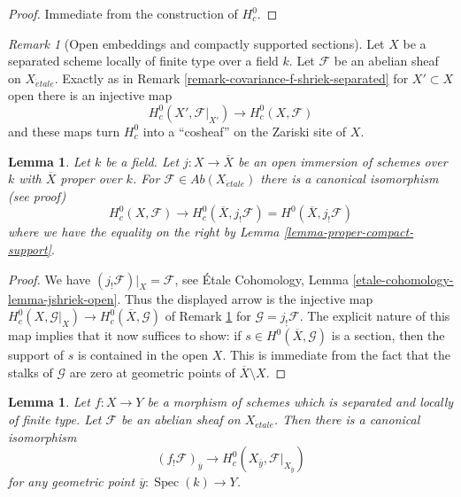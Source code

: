 \documentclass{stacks-project}
\theoremstyle{plain}
\newtheorem{lemma}[subsection]{Lemma}
\theoremstyle{definition}
\theoremstyle{remark}
\newtheorem{remark}[subsection]{Remark}
\numberwithin{equation}{subsection}
\def\Spec{\mathop{\mathrm{Spec}}}
\def\etale{{\acute{e}tale}}
\begin{document}
\begin{proof}
Immediate from the construction of $H^0_c$.
\end{proof}

\begin{remark}[Open embeddings and compactly supported sections]
\label{remark-covariance-compact-support}
Let $X$ be a separated scheme locally of finite type over a field $k$.
Let $\mathcal{F}$ be an abelian sheaf on $X_\etale$.
Exactly as in Remark \ref{remark-covariance-f-shriek-separated}
for $X' \subset X$ open there is an injective map
$$
H^0_c(X', \mathcal{F}|_{X'}) \longrightarrow H^0_c(X, \mathcal{F})
$$
and these maps turn $H^0_c$ into a ``cosheaf'' on the Zariski site of $X$.
\end{remark}

\begin{lemma}
\label{lemma-compactify-compact-support}
Let $k$ be a field. Let $j : X \to \overline{X}$ be an open
immersion of schemes over $k$ with $\overline{X}$ proper over $k$.
For $\mathcal{F} \in \textit{Ab}(X_\etale)$
there is a canonical isomorphism (see proof)
$$
H^0_c(X, \mathcal{F}) \longrightarrow
H^0_c(\overline{X}, j_!\mathcal{F}) =
H^0(\overline{X}, j_!\mathcal{F})
$$
where we have the equality on the right by
Lemma \ref{lemma-proper-compact-support}.
\end{lemma}

\begin{proof}
We have $(j_!\mathcal{F})|_X = \mathcal{F}$, see
\'Etale Cohomology, Lemma \ref{etale-cohomology-lemma-jshriek-open}.
Thus the displayed arrow is the injective map
$H^0_c(X, \mathcal{G}|_X) \to H^0_c(\overline{X}, \mathcal{G})$
of Remark \ref{remark-covariance-compact-support}
for $\mathcal{G} = j_!\mathcal{F}$. The explicit nature
of this map implies that it now suffices to show: if
$s \in H^0(\overline{X}, \mathcal{G})$ is a section, then the support of
$s$ is contained in the open $X$. This is immediate from the fact
that the stalks of $\mathcal{G}$ are zero at geometric
points of $\overline{X} \setminus X$.
\end{proof}

\begin{lemma}
\label{lemma-stalk-f-shriek-separated}
Let $f : X \to Y$ be a morphism of schemes which is separated and
locally of finite type. Let $\mathcal{F}$ be an abelian sheaf on
$X_\etale$. Then there is a canonical isomorphism
$$
(f_!\mathcal{F})_{\overline{y}}
\longrightarrow
H^0_c(X_{\overline{y}}, \mathcal{F}|_{X_{\overline{y}}})
$$
for any geometric point $\overline{y} : \Spec(k) \to Y$.
\end{lemma}
\end{document}
